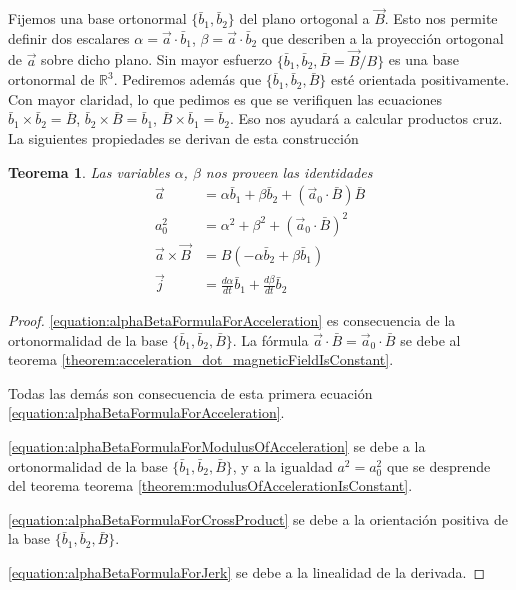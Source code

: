 \documentclass{article}
\newcommand{\realNumbers}{\mathbb{R}}
\newtheorem{theorem}{Teorema}
\begin{document}
  Fijemos una base ortonormal \(\{\bar{b}_1, \bar{b}_2\}\) del plano ortogonal a \(\vec{B}\).
  Esto nos permite definir dos escalares \(\alpha = \vec{a} \cdot \bar{b}_1\), \(\beta = \vec{a} \cdot \bar{b}_2\) que describen a la proyección ortogonal de \(\vec{a}\) sobre dicho plano.
  Sin mayor esfuerzo \(\{\bar{b}_1, \bar{b}_2, \bar{B} = \vec{B} / B\}\) es una base ortonormal de \(\realNumbers^3\).
  Pediremos además que \(\{\bar{b}_1, \bar{b}_2, \bar{B}\}\) esté orientada positivamente.
  Con mayor claridad, lo que pedimos es que se verifiquen las ecuaciones \(\bar{b}_1 \times \bar{b}_2 = \bar{B}\), \(\bar{b}_2 \times \bar{B} = \bar{b}_1\), \(\bar{B} \times \bar{b}_1 = \bar{b}_2\).
  Eso nos ayudará a calcular productos cruz.
  La siguientes propiedades se derivan de esta construcción
  \begin{theorem}
    Las variables \(\alpha\), \(\beta\) nos proveen las identidades
    \begin{align}
      \label{equation:alphaBetaFormulaForAcceleration}
      \vec{a}
      &=
      \alpha \bar{b}_1 + \beta \bar{b}_2 + (\vec{a}_0 \cdot \bar{B}) \bar{B}
      \\
      \label{equation:alphaBetaFormulaForModulusOfAcceleration}
      a_0^2
      &=
      \alpha^2 + \beta^2 + (\vec{a}_0 \cdot \bar{B})^2
      \\
      \label{equation:alphaBetaFormulaForCrossProduct}
      \vec{a} \times \vec{B}
      &=
      B (- \alpha \bar{b}_2 + \beta \bar{b}_1)
      \\
      \label{equation:alphaBetaFormulaForJerk}
      \vec{j}
      &=
      \frac{d \alpha}{d t} \bar{b}_1 + \frac{d \beta}{d t} \bar{b}_2
    \end{align}
  \end{theorem}
  \begin{proof}
    \eqref{equation:alphaBetaFormulaForAcceleration}
    es consecuencia de la ortonormalidad de la base \(\{\bar{b}_1, \bar{b}_2, \bar{B}\}\).
    La fórmula \(\vec{a} \cdot \bar{B} = \vec{a}_0 \cdot \bar{B}\) se debe al teorema \ref{theorem:acceleration_dot_magneticFieldIsConstant}.

    Todas las demás son consecuencia de esta primera ecuación \eqref{equation:alphaBetaFormulaForAcceleration}.

    \eqref{equation:alphaBetaFormulaForModulusOfAcceleration}
    se debe a la ortonormalidad de la base \(\{\bar{b}_1, \bar{b}_2, \bar{B}\}\), y a la igualdad \(a^2 = a_0^2\) que se desprende del teorema teorema \ref{theorem:modulusOfAccelerationIsConstant}.

    \eqref{equation:alphaBetaFormulaForCrossProduct}
    se debe a la orientación positiva de la base \(\{\bar{b}_1, \bar{b}_2, \bar{B}\}\).

    \eqref{equation:alphaBetaFormulaForJerk}
    se debe a la linealidad de la derivada.
  \end{proof}
\end{document}
